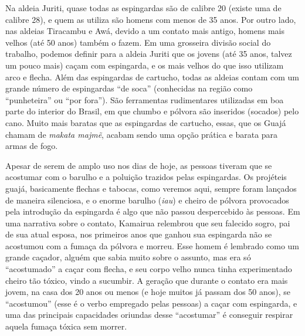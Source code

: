 Na aldeia Juriti, quase todas as espingardas são de calibre 20 (existe
uma de calibre 28), e quem as utiliza são homens com menos de 35 anos.
Por outro lado, nas aldeias Tiracambu e Awá, devido a um
contato mais antigo, homens mais velhos (até 50 anos) também o fazem. Em
uma grosseira divisão social do trabalho, podemos definir para a aldeia
Juriti que os jovens (até 35 anos, talvez um pouco mais) caçam com
espingarda, e os mais velhos do que isso utilizam arco e flecha. Além
das espingardas de cartucho, todas as aldeias contam com um grande
número de espingardas ``de soca'' (conhecidas na região como
``punheteira'' ou ``por fora''). São ferramentas rudimentares utilizadas
em boa parte do interior do Brasil, em que chumbo e pólvora são
inseridos (socados) pelo cano. Muito mais baratas que as espingardas de
cartucho, essas, que os Guajá chamam de \emph{makata majmẽ}, acabam
sendo uma opção prática e barata para armas de fogo.

Apesar de serem de amplo uso nos dias de hoje, as pessoas tiveram que se
acostumar com o barulho e a poluição trazidos pelas espingardas. Os
projéteis guajá, basicamente flechas e tabocas, como veremos aqui,
sempre foram lançados de maneira silenciosa, e o enorme barulho
(\emph{iau}) e cheiro de pólvora provocados pela introdução da
espingarda é algo que não passou despercebido às pessoas. Em uma
narrativa sobre o contato, Kamairua relembrou que seu falecido sogro,
pai de sua atual esposa, nos primeiros anos que ganhou sua espingarda
não se acostumou com a fumaça da pólvora e morreu. Esse homem é lembrado
como um grande caçador, alguém que sabia muito sobre o assunto, mas era
só ``acostumado'' a caçar com flecha, e seu corpo velho nunca tinha
experimentado cheiro tão tóxico, vindo a sucumbir. A geração que durante
o contato era mais jovem, na casa dos 20 anos ou menos (e hoje muitos já
passam dos 50 anos), se ``acostumou'' (esse é o verbo empregado pelas
pessoas) a caçar com espingarda, e uma das principais capacidades
oriundas desse ``acostumar'' é conseguir respirar aquela fumaça tóxica
sem morrer.

